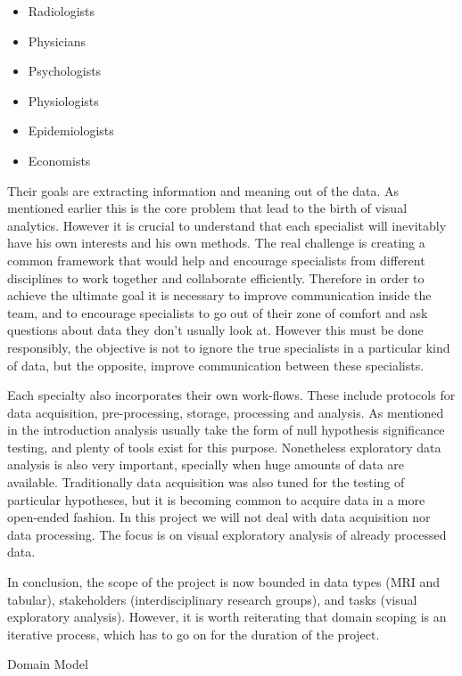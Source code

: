 \begin{itemize}
\item Radiologists
\item Physicians
\item Psychologists
\item Physiologists
\item Epidemiologists
\item Economists
\end{itemize}

Their goals are extracting information and meaning out of the data. As mentioned earlier this is the core problem that lead to the birth of visual analytics. However it is crucial to understand that each specialist will inevitably have his own interests and his own methods. The real challenge is creating a common framework that would help and encourage specialists from different disciplines to work together and collaborate efficiently. Therefore in order to achieve the ultimate goal it is necessary to improve communication inside the team, and to encourage specialists to go out of their zone of comfort and ask questions about data they don't usually look at. However this must be done responsibly, the objective is not to ignore the true specialists in a particular kind of data, but the opposite, improve communication between these specialists. 

Each specialty also incorporates their own work-flows. These include protocols for data acquisition, pre-processing, storage, processing and analysis. As mentioned in the introduction analysis usually take the form of null hypothesis significance testing, and plenty of tools exist for this purpose. Nonetheless exploratory data analysis is also very important, specially when huge amounts of data are available. Traditionally data acquisition was also tuned for the testing of particular hypotheses, but it is becoming common to acquire data in a more open-ended fashion. In this project we will not deal with data acquisition nor data processing. The focus is on visual exploratory analysis of already processed data.  

In conclusion, the scope of the project is now bounded in data types (MRI and tabular), stakeholders (interdisciplinary research groups), and tasks (visual exploratory analysis). However, it is worth reiterating that domain scoping is an iterative process, which has to go on for the duration of the project. 

Domain Model

%


